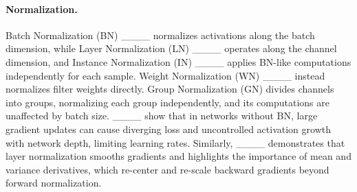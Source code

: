 \paragraph{Normalization.} Batch Normalization (BN) ____ normalizes activations along the batch dimension, while Layer Normalization (LN) ____ operates along the channel dimension, and Instance Normalization (IN) ____ applies BN-like computations independently for each sample. Weight Normalization (WN) ____ instead normalizes filter weights directly. Group Normalization (GN) divides channels into groups, normalizing each group independently, and its computations are unaffected by batch size. ____ show that in networks without BN, large gradient updates can cause diverging loss and uncontrolled activation growth with network depth, limiting learning rates. Similarly, ____ demonstrates that layer normalization smooths gradients and highlights the importance of mean and variance derivatives, which re-center and re-scale backward gradients beyond forward normalization.